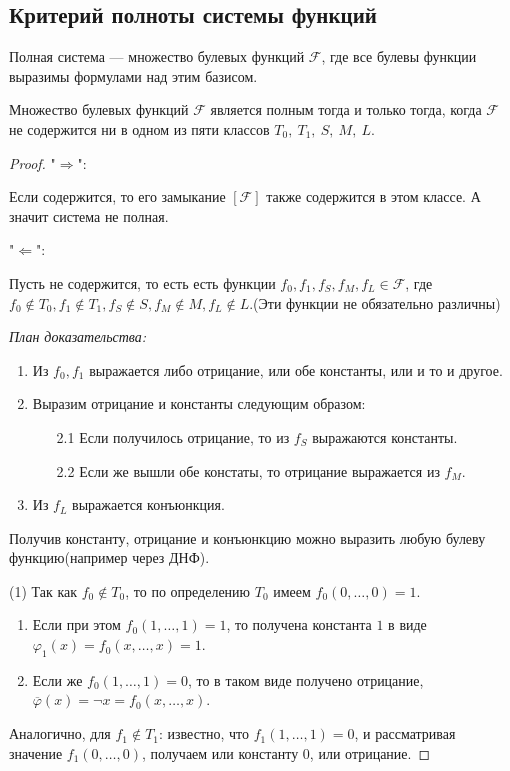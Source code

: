 \subsection{Критерий полноты системы функций}

\begin{defn}
    Полная система --- множество булевых функций $\mathcal{F}$, где все булевы функции выразимы формулами над этим базисом.
\end{defn}

\begin{theorem}[Пост, 1921]
    Множество булевых функций $\mathcal{F}$ является полным тогда и только тогда, когда $\mathcal{F}$ не содержится ни в одном из пяти классов $T_0,\ T_1,\ S,\ M,\ L$.
\end{theorem}

\begin{proof}

    "$\Rightarrow$":
    
    Если содержится, то его замыкание $[\mathcal{F}]$ также содержится в этом классе. А значит система не полная.
    
    "$\Leftarrow$":
    
    Пусть не содержится, то есть есть функции $f_0, f_1, f_S, f_M, f_L \in \mathcal{F}$, где $f_0 \notin T_0, f_1 \notin T_1, f_S \notin S, f_M \notin M, f_L \notin L$.(Эти функции не обязательно различны)

    \textsl{План доказательства:}
    \begin{enumerate}
        \item Из $f_0, f_1$ выражается либо отрицание, или обе константы, или и то и другое.
        \item Выразим отрицание и константы следующим образом:
        \begin{enumerate}
            \item[2.1] Если получилось отрицание, то из $f_S$ выражаются константы.
            \item[2.2] Если же вышли обе констаты, то отрицание выражается из $f_M$.
        \end{enumerate}
        \item Из $f_L$ выражается конъюнкция.
    \end{enumerate}
    
    Получив константу, отрицание и конъюнкцию можно выразить любую булеву функцию(например через ДНФ).

    (1) Так как $f_0 \notin T_0$, то по определению $T_0$ имеем $f_0(0, \ldots, 0) = 1$.
    \begin{enumerate}
        \item Если при этом $f_0(1, \ldots, 1) = 1$, то получена константа $1$ в виде $\varphi_1(x) = f_0(x, \ldots, x) = 1$.
        \item Если же $f_0(1, \ldots, 1) = 0$, то в таком виде получено отрицание, $\overline{\varphi}(x) = \neg x = f_0(x, \ldots, x)$. 
    \end{enumerate}
    Аналогично, для $f_1 \notin T_1$: известно, что $f_1(1, \ldots, 1) = 0$, и рассматривая значение $f_1(0, \ldots, 0)$, получаем или константу 0, или отрицание.
    

\end{proof}
